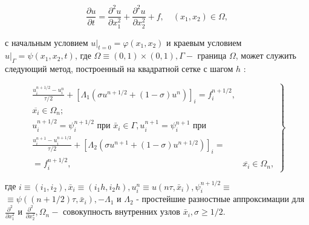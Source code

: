 \documentclass[10pt]{article}
\begin{document}
\[

\frac{\partial u}{\partial t}=\frac{\partial^{2} u}{\partial x_{1}^{2}}+\frac{\partial^{2} u}{\partial x_{2}^{2}}+f, \quad\left(x_{1}, x_{2}\right) \in \Omega,

\]



с начальным условием $\left.u\right|_{t=0}=\varphi\left(x_{1}, x_{2}\right)$ и краевым условием $\left.u\right|_{\Gamma}=\psi\left(x_{1}, x_{2}, t\right)$, где $\Omega \equiv(0,1) \times(0,1), \Gamma-$ граница $\Omega$, может служить следующий метод, построенный на квадратной сетке с шагом $h$ :



\[

\left.\begin{array}{cc}

\frac{u_{i}^{n+1 / 2}-u_{i}^{n}}{\tau / 2}+\left[\Lambda_{1}\left(\sigma u^{n+1 / 2}+(1-\sigma) u^{n}\right)\right]_{i}=f_{i}^{n+1 / 2}, \\

\overline{x_{i}} \in \Omega_{n} ; \\

u_{i}^{n+1 / 2}=\psi_{i}^{n+1 / 2} \text { при } \bar{x}_{i} \in \Gamma, u_{i}^{n+1}=\psi_{i}^{n+1} \text { при } \\

\frac{u_{i}^{n+1}-u_{i}^{n+1 / 2}}{\tau / 2}+\left[\Lambda_{2}\left(\sigma u^{n+1}+(1-\sigma) u^{n+1 / 2}\right)\right]_{i}= \\

=f_{i}^{n+1 / 2}, & \overline{x_{i}} \in \Omega_{n},

\end{array}\right\}

\]



где $i \equiv\left(i_{1}, i_{2}\right), \bar{x}_{i} \equiv\left(i_{1} h, i_{2} h\right), u_{i}^{n} \equiv u\left(n \tau, \bar{x}_{i}\right), \psi_{i}^{n+1 / 2} \equiv$ $\equiv \psi\left((n+1 / 2) \tau, \bar{x}_{i}\right),-\Lambda_{1}$ и $\Lambda_{2}$ - простейшие разностные аппроксимации для $\frac{\partial^{2}}{\partial x_{1}^{2}}$ и $\frac{\partial^{2}}{\partial x_{2}^{2}}, \Omega_{n}-$ совокупность внутренних узлов $\bar{x}_{i}, \sigma \geqslant 1 / 2$.
\end{document}
